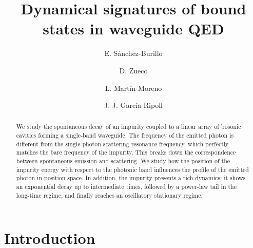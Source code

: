 \documentclass[aps,pra,twocolumn,floatfix,superscriptaddress]{revtex4-1}%
\begin{document}
\title{Dynamical signatures of bound states in waveguide QED}

\author{E. S\'anchez-Burillo}
\author{D. Zueco}
\author{L. Mart\'in-Moreno}
\author{J. J. Garc\'ia-Ripoll}
\begin{abstract}
We study the spontaneous decay of an impurity coupled to a linear array of bosonic cavities forming a single-band waveguide. The frequency of the emitted photon is different from the single-photon scattering resonance frequency, which perfectly matches the bare frequency of the impurity. This breaks down the correspondence between spontaneous emission and scattering. We study how the position of the impurity energy with respect to the photonic band influences the profile of the emitted photon in position space. In addition, the impurity presents a rich dynamics: it shows an exponential decay up to intermediate times, followed by a power-law tail in the long-time regime, and finally reaches an oscillatory stationary regime.
\end{abstract}

\maketitle

\section{Introduction}
\end{document}

